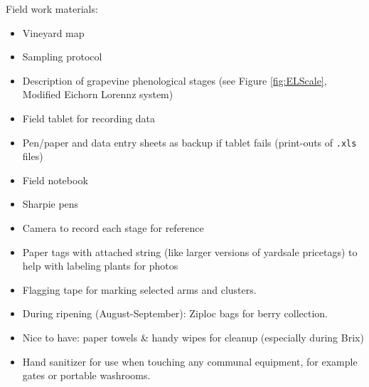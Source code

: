\documentclass[11pt,letter]{article}
\newenvironment{smitemize}{
\begin{itemize}
  \setlength{\itemsep}{0pt}
  \setlength{\parskip}{0.8pt}
  \setlength{\parsep}{0pt}}
{\end{itemize}
}
\begin{document}
Field work materials:
\begin{smitemize}
\item Vineyard map
\item Sampling protocol
\item Description of grapevine phenological stages (see Figure \ref{fig:ELScale}, Modified Eichorn Lorennz system)
\item Field tablet for recording data
\item Pen/paper and data entry sheets as backup if tablet fails (print-outs of \verb|.xls| files)
\item Field notebook
\item Sharpie pens
\item Camera to record each stage for reference
\item Paper tags with attached string (like larger versions of yardsale pricetags) to help with labeling plants for photos 
\item Flagging tape for marking selected arms and clusters.
\item During ripening (August-September): Ziploc bags for berry collection.
\item Nice to have: paper towels \& handy wipes for cleanup (especially during Brix)
\item Hand sanitizer for use when touching any communal equipment, for example gates or portable washrooms.
\end{smitemize}
\end{document}
